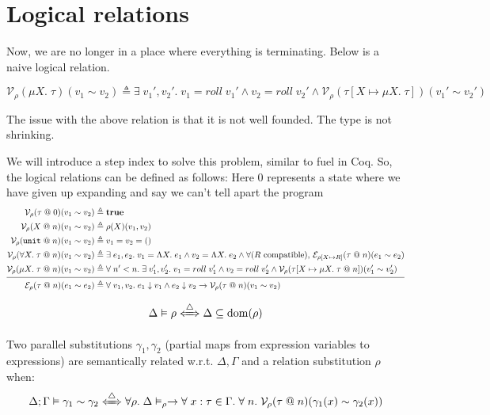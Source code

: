 \documentclass{notes}
\newcommand{\unit}{()}
\newcommand{\Unit}{\texttt{unit}}
\newcommand{\V}{\mathcal{V}}
\newcommand{\E}{\mathcal{E}}
\begin{document}
\section{Logical relations}

Now, we are no longer in a place where everything is terminating. Below is a naive logical relation.


 \[\V_\rho(\mu X.\; \tau)(v_1 \sim v_2) \triangleq \exists\; v_1', v_2'.\; v_1 = roll\; v_1' \land v_2 = roll\; v_2' \land  \V_\rho(\tau[X \mapsto \mu X.\;\tau]) (v_1' \sim v_2') \]


The issue with the above relation is that it is not well founded. The type is not shrinking.

We will introduce a step index to solve this problem, similar to fuel in Coq.
\newline
So, the logical relations can be defined as follows:\newline
Here 0 represents a state where we have given up expanding and say we can't tell apart the program
\begin{align*}
  \V_\rho(\tau\; @\; 0)(v_1\sim v_2) &\triangleq \textbf{true} 
  \\ 
  \V_\rho(X\; @\; n)(v_1\sim v_2) &\triangleq \rho(X)(v_1,v_2)\\
  \V_\rho(\Unit\; @\; n)(v_1\sim v_2) &\triangleq v_1=v_2=\unit\\
  \V_\rho(\forall X.\;\tau\; @\; n)(v_1\sim v_2) &\triangleq \exists\; e_1,e_2.\;v_1=\Lambda X.\;e_1\land v_2=\Lambda X.\;e_2\land \forall (R\text{ compatible}) , \, \E_{\rho[X\mapsto R]}(\tau\; @\; n)(e_1 \sim e_2)\\
  \V_\rho(\mu X.\;\tau\; @\; n)(v_1\sim v_2) &\triangleq \forall\; n'<n.\; \exists\; v_1', v_2'.\; v_1 = roll\; v_1' \land v_2 = roll\; v_2' \land  \V_\rho(\tau[X \mapsto \mu X.\;\tau \; @ \; n]) (v_1' \sim v_2')\\
  \noalign{\smallskip} \hline \noalign{\smallskip}
  \E_\rho(\tau\;@\;n)(e_1 \sim e_2) &\triangleq \forall \; v_1,v_2.\;e_1\downarrow v_1\land e_2\downarrow v_2\to \V_\rho(\tau\; @ \; n)(v_1\sim v_2)
\end{align*}



\begin{defn}

  \[\Delta\vDash \rho \xLeftrightarrow{\triangle} \Delta\subseteq \operatorname{dom}(\rho) \]
\end{defn}

\begin{defn}
  Two parallel substitutions $\gamma_1,\gamma_2$ (partial maps from expression variables to expressions) are semantically related w.r.t. $\Delta ,\Gamma$ and a relation substitution $\rho$ when:
  \[\Delta;\Gamma\vDash \gamma_1\sim \gamma_2 \xLeftrightarrow{\triangle} \forall \rho. \; \Delta \vDash_\rho \to \forall\; x: \tau \in \Gamma. \; \forall\; n.\; \V_\rho(\tau\;@\;n)(\gamma_1(x)\sim \gamma_2(x))\]
\end{defn}
\end{document}
